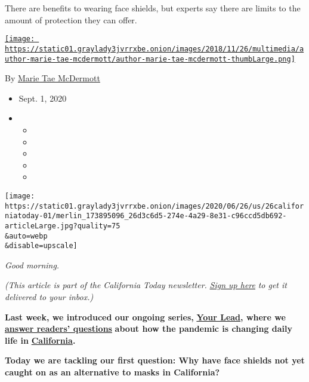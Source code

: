 There are benefits to wearing face shields, but experts say there are
limits to the amount of protection they can offer.

\href{https://www.nytimes3xbfgragh.onion/by/marie-tae-mcdermott}{\texttt{[image: https://static01.graylady3jvrrxbe.onion/images/2018/11/26/multimedia/author-marie-tae-mcdermott/author-marie-tae-mcdermott-thumbLarge.png]}}

By
\href{https://www.nytimes3xbfgragh.onion/by/marie-tae-mcdermott}{Marie
Tae McDermott}

\begin{itemize}
\item
  Sept. 1, 2020
\item
  \begin{itemize}
  \item
  \item
  \item
  \item
  \item
  \end{itemize}
\end{itemize}

\texttt{[image: https://static01.graylady3jvrrxbe.onion/images/2020/06/26/us/26californiatoday-01/merlin\_173895096\_26d3c6d5-274e-4a29-8e31-c96ccd5db692-articleLarge.jpg?quality=75\\\&auto=webp\\\&disable=upscale]}

\emph{Good morning.}

\emph{(This article is part of the California Today newsletter.}
\href{https://nl.nytimes3xbfgragh.onion/f/a/M0CriPlnjUtA-B6ZFjDGfA~~/AAAAAQA~/RgRg1yvzP0TOaHR0cHM6Ly93d3cubnl0aW1lcy5jb20vbmV3c2xldHRlcnMvY2FsaWZvcm5pYS10b2RheT9jYW1wYWlnbl9pZD00OSZlbWM9ZWRpdF9jYV8yMDIwMDYyNSZpbnN0YW5jZV9pZD0xOTcwNCZubD1jYWxpZm9ybmlhLXRvZGF5JnJlZ2lfaWQ9Njg1MTk1NzMmc2VnbWVudF9pZD0zMTgzMSZ0ZT0xJnVzZXJfaWQ9YWM0Y2EyOTY2ZDMzMTZiMmUyZjZmZmJiNmE1ODQxOTJXA255dEIKADzzpvRempqTllIbbWFyaWUubWNkZXJtb3R0QG55dGltZXMuY29tWAQAAAAA}{\emph{Sign
up here}} \emph{to get it delivered to your inbox.)}

\textbf{Last week, we introduced our ongoing series,}
\textbf{\href{https://www.nytimes3xbfgragh.onion/series/your-lead}{Your
Lead}, where we}
\textbf{\href{https://www.nytimes3xbfgragh.onion/2020/06/17/us/coronavirus-california-life.html}{answer
readers' questions}} \textbf{about how the pandemic is changing daily
life in}
\textbf{\href{https://www.nytimes3xbfgragh.onion/2020/06/29/us/california-coronavirus-reopening.html}{California}.}

\textbf{Today we are tackling our first question: Why have face shields
not yet caught on as an alternative to masks in California?}

